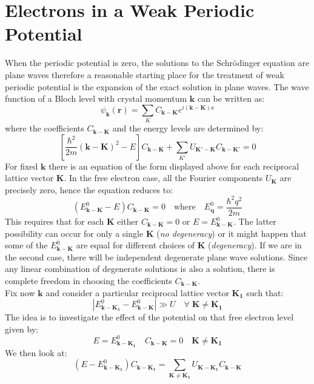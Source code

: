 \documentclass[10.75pt,a4paper,openright,bottom=2cm]{article}
\renewcommand{\Vec}[1]{\boldsymbol{#1}}
\begin{document}
\section{Electrons in a Weak Periodic Potential}
When the periodic potential is zero, the solutions to the Schr\"odinger equation are plane waves therefore a reasonable starting place for the treatment of weak periodic potential is the expansion of the exact solution in plane waves. The wave function of a Bloch level with crystal momentum $\Vec{k}$ can be written as:
\[
\psi_{\Vec{k}}(\Vec{r})=\sum_KC_{\Vec{k}-\Vec{K}}e^{i(\Vec{k}-\Vec{K})x}
\]
where the coefficients $C_{\Vec{k}-\Vec{K}}$ and the energy levels are determined by:
\begin{equation}
\label{ckk}
\left[\frac{\hbar^2}{2m}(\Vec{k}-\Vec{K})^2-E\right]C_{\Vec{k}-\Vec{K}}+\sum_{K'}U_{\Vec{K'}-\Vec{K}}C_{\Vec{k}-\Vec{K'}}=0
\end{equation}
For fixed $\Vec{k}$ there is an equation of the form displayed above for each reciprocal lattice vector $\Vec{K}$. In the free electron case, all the Fourier components $U_{\Vec{K}}$ are precisely zero, hence the equation reduces to:
\[
(E^0_{\Vec{k}-\Vec{K}}-E)C_{\Vec{k}-\Vec{K}}=0 \quad \text{where} \quad E^0_{\Vec{q}}=\frac{\hbar^2q^2}{2m}
\]
This requires that for each $\Vec{K}$ either $C_{\Vec{k}-\Vec{K}}=0$ or $E=E^0_{\Vec{k}-\Vec{K}}$. The latter possibility can occur for only a single $\Vec{K}$ (\textit{no degeneracy}) or it might happen that some of the $E^0_{\Vec{k}-\Vec{K}}$ are equal for different choices of $\Vec{K}$ (\textit{degeneracy}). If we are in the second case, there will be independent degenerate plane wave solutions. Since any linear combination of degenerate solutions is also a solution, there is complete freedom in choosing the coefficients $C_{\Vec{k}-\Vec{K}}$.\\
Fix now $\Vec{k}$ and consider a particular reciprocal lattice vector $\Vec{K_1}$ such that:
\begin{equation}
\label{assumption}
|E^0_{\Vec{k}-\Vec{K_1}}-E^0_{\Vec{k}-\Vec{K}}|\gg U \quad \forall\;\Vec{K}\neq\Vec{K_1}
\end{equation}
The idea is to investigate the effect of the potential on that free electron level given by:
\[
E=E^0_{\Vec{k}-\Vec{K_1}} \quad C_{\Vec{k}-\Vec{K}}=0 \quad \Vec{K}\neq\Vec{K_1}
\]
We then look at:
\begin{equation}
\label{sub}
(E-E^0_{\Vec{k}-\Vec{K_1}})C_{\Vec{k}-\Vec{K_1}}=\sum_{\Vec{K}\neq\Vec{K_1}}U_{\Vec{K}-\Vec{K_1}}C_{\Vec{k}-\Vec{K}}
\end{equation}
\end{document}
